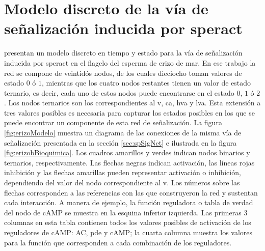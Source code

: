 
\section{Modelo discreto de la vía de señalización inducida por speract}\label{sect:erizo}


\citeauthor{Espinal2011} \citep{Espinal2011} presentan un modelo discreto en tiempo y estado para la vía de señalización inducida por speract en el flagelo del esperma de erizo de mar. En ese trabajo la red se compone de veintidós nodos, de los cuales  dieciocho toman valores de estado $0$ ó $1$, mientras que los cuatro nodos restantes tienen un valor de estado ternario, es decir, cada uno de estos nodos puede encontrarse en el estado $0$, $1$ ó $2$. Los nodos ternarios son los correspondientes al \acf{v}, \acf{ca}, \acf{hva} y \acf{lva}. Esta extensión a tres valores posibles es necesaria para capturar los estados posibles en los que se puede encontrar un componente de esta red de señalización. La figura \ref{fig:erizoModelo} muestra un diagrama de las conexiones de la misma vía de señalización presentada en la sección \ref{sec:spSigNet} e ilustrada en la figura \ref{fig:erizobBioquimica}. Los cuadros amarillos y verdes indican nodos binarios y ternarios, respectivamente. Las flechas negras indican activación, las líneas rojas inhibición y las flechas amarillas pueden representar activación o inhibición, dependiendo del valor del nodo correspondiente al \acf{v}. Los números sobre las flechas corresponden a las referencias con las que \citeauthor{Espinal2011} \citep{Espinal2011} construyeron la red y sustentan cada interacción. A manera de ejemplo, la función reguladora o tabla de verdad del nodo de \ac{cAMP} se muestra en la esquina inferior izquierda. Las primeras 3 columnas en esta tabla contienen todos los valores posibles de activación de los reguladores de \ac{cAMP}: \ac{AC}, \ac{pde} y \ac{cAMP}; la cuarta columna muestra los valores para la función que corresponden a cada combinación de los reguladores.

